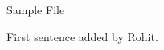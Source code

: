 \documentclass{article}
\begin{document}
\centerline{\sc \large Sample File}
\vspace{.5pc}
\centerline{\sc }
\vspace{2pc}

First sentence added by Rohit.
\end{document}
